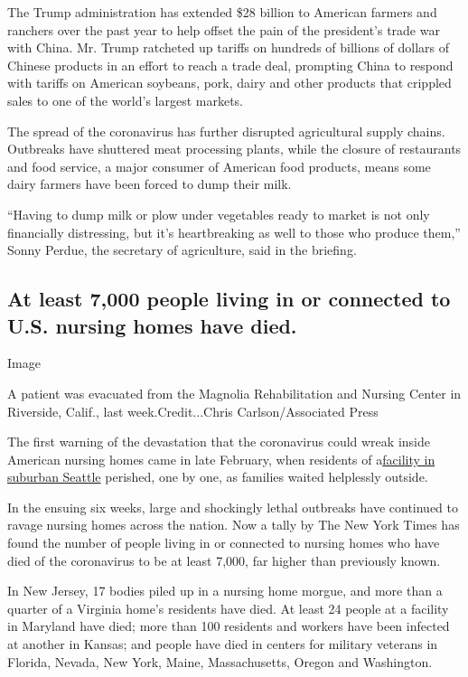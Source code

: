 The Trump administration has extended \$28 billion to American farmers
and ranchers over the past year to help offset the pain of the
president's trade war with China. Mr. Trump ratcheted up tariffs on
hundreds of billions of dollars of Chinese products in an effort to
reach a trade deal, prompting China to respond with tariffs on American
soybeans, pork, dairy and other products that crippled sales to one of
the world's largest markets.

The spread of the coronavirus has further disrupted agricultural supply
chains. Outbreaks have shuttered meat processing plants, while the
closure of restaurants and food service, a major consumer of American
food products, means some dairy farmers have been forced to dump their
milk.

``Having to dump milk or plow under vegetables ready to market is not
only financially distressing, but it's heartbreaking as well to those
who produce them,'' Sonny Perdue, the secretary of agriculture, said in
the briefing.

\hypertarget{at-least-7000-people-living-in-or-connected-to-us-nursing-homes-have-died}{%
\subsection{At least 7,000 people living in or connected to U.S. nursing
homes have
died.}\label{at-least-7000-people-living-in-or-connected-to-us-nursing-homes-have-died}}

Image

A patient was evacuated from the Magnolia Rehabilitation and Nursing
Center in Riverside, Calif., last week.Credit...Chris Carlson/Associated
Press

The first warning of the devastation that the coronavirus could wreak
inside American nursing homes came in late February, when residents of
a\href{https://www.nytimes3xbfgragh.onion/2020/03/21/us/coronavirus-nursing-home-kirkland-life-care.html}{facility
in suburban Seattle} perished, one by one, as families waited helplessly
outside.

In the ensuing six weeks, large and shockingly lethal outbreaks have
continued to ravage nursing homes across the nation. Now a tally by The
New York Times has found the number of people living in or connected to
nursing homes who have died of the coronavirus to be at least 7,000, far
higher than previously known.

In New Jersey, 17 bodies piled up in a nursing home morgue, and more
than a quarter of a Virginia home's residents have died. At least 24
people at a facility in Maryland have died; more than 100 residents and
workers have been infected at another in Kansas; and people have died in
centers for military veterans in Florida, Nevada, New York, Maine,
Massachusetts, Oregon and Washington.

